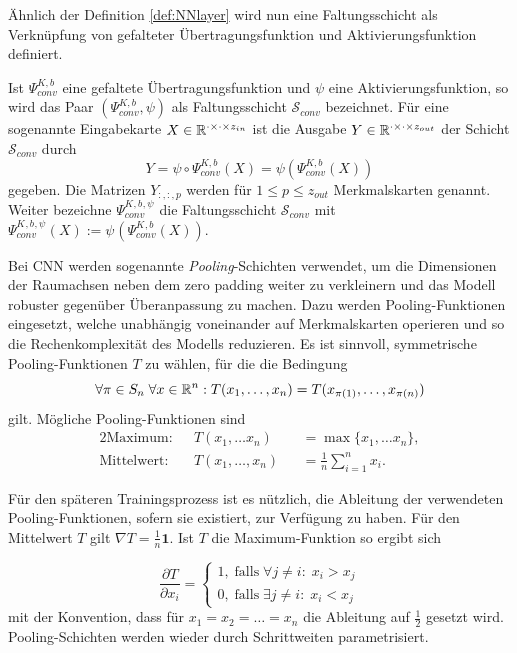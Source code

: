 Ähnlich der Definition \ref{def:NNlayer} wird nun eine Faltungsschicht als Verknüpfung von gefalteter Übertragungsfunktion und Aktivierungsfunktion definiert.

\begin{defi}[Faltungsschicht]
    \label{def:convlayer}
    Ist $\Psi_{conv}^{K,b}$ eine gefaltete Übertragungsfunktion und $\psi$ eine Aktivierungsfunktion, so wird das Paar $(\Psi_{conv}^{K,b}, \psi)$ als Faltungsschicht $\mathcal{S}_{conv}$ bezeichnet. Für eine sogenannte Eingabekarte $X \in \mathbb{R}^{\cdot \times \cdot \times z_{in}}$ ist die Ausgabe $Y \in \mathbb{R}^{\cdot \times \cdot \times z_{out}}$ der Schicht $\mathcal{S}_{conv}$ durch
    \[Y=\psi \circ \Psi_{conv}^{K,b}(X)= \psi\left(\Psi_{conv}^{K,b}(X)\right)
        \] 
        gegeben. Die Matrizen $Y_{:,:,p}$ werden für $1 \leq p \leq z_{out}$ Merkmalskarten genannt. Weiter bezeichne $\Psi_{conv}^{K^{},b^{},\psi_{}}$ die Faltungsschicht $\mathcal{S}_{conv}$ mit $\Psi_{conv}^{K^{},b^{},\psi_{}}(X):= \psi_{} \left(\Psi_{conv}^{K^{},b^{}}(X)\right)$.
\end{defi}

Bei CNN werden sogenannte \textit{Pooling}-Schichten verwendet, um die Dimensionen der Raumachsen neben dem zero padding weiter zu verkleinern und das Modell robuster gegenüber Überanpassung zu machen. Dazu werden Pooling-Funktionen eingesetzt, welche unabhängig voneinander auf Merkmalskarten operieren und so die Rechenkomplexität des Modells reduzieren. Es ist sinnvoll, symmetrische Pooling-Funktionen $T$ zu wählen, für die die Bedingung
\begin{equation*}
    \forall \pi \in S_n \; \forall x \in \mathbb{R}^n: T(x_1, \ldots, x_n)=T(x_{\pi(1)}, \ldots, x_{\pi(n)})
\end{equation*}
gilt. Mögliche Pooling-Funktionen sind 
\begin{alignat*}{2}
    \text{Maximum}: \; \;&T(x_1, \ldots x_n) &&= \max\{x_1, \ldots x_n\},\\
    \text{Mittelwert}: \; \;&T(x_1, \ldots, x_n) &&= \frac{1}{n} \sum_{i=1}^n x_i. 
 \end{alignat*}

Für den späteren Trainingsprozess ist es nützlich, die Ableitung der verwendeten Pooling-Funktionen, sofern sie existiert, zur Verfügung zu haben. Für den Mittelwert $T$ gilt $\nabla T=\frac{1}{n} \textbf{1}$. Ist $T$ die Maximum-Funktion so ergibt sich

\begin{equation*}
    \frac{\partial T}{\partial x_i}= \begin{cases}
        1 , \; \text{falls}  \; \forall j \neq i: \; x_i >x_j \\
        0 , \; \text{falls}  \; \exists j \neq i: \; x_i <x_j
    \end{cases}
\end{equation*}
mit der Konvention, dass für $x_1=x_2= \ldots=x_n$ die Ableitung auf $\frac{1}{2}
$ gesetzt wird. Pooling-Schichten werden wieder durch Schrittweiten parametrisiert.

